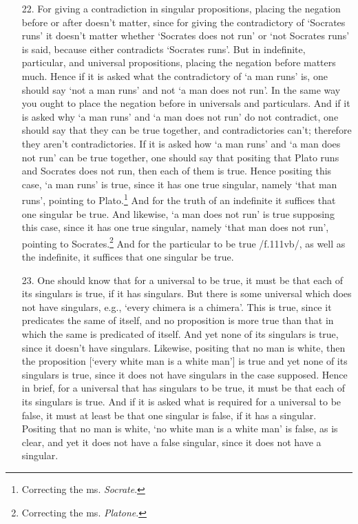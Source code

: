 \begin{enumerate}
\item[22.] For giving a contradiction in singular propositions, placing the negation before or after doesn't matter, since for giving the contradictory of `Socrates runs' it doesn't matter whether `Socrates does not run' or `not Socrates runs' is said, because either contradicts `Socrates runs'. But in indefinite, particular, and universal propositions, placing the negation before matters much. Hence if it is asked what the contradictory of `a man runs' is, one should say `not a man runs' and not `a man does not run'. In the same way you ought to place the negation before in universals and particulars. And if it is asked why `a man runs' and `a man does not run' do not contradict, one should say that they can be true together, and contradictories can't; therefore they aren't contradictories. If it is asked how `a man runs' and `a man does not run' can be true together, one should say that positing that Plato runs and Socrates does not run, then each of them is true. Hence positing this case, `a man runs' is true, since it has one true singular, namely `that man runs', pointing to Plato.\footnote{Correcting the ms. \textit{Socrate}.} And for the truth of an indefinite it suffices that one singular be true. And likewise, `a man does not run' is true supposing this case, since it has one true singular, namely `that man does not run', pointing to Socrates.\footnote{Correcting the ms. \textit{Platone}.} And for the particular to be true /f.111vb/, as well as the indefinite, it suffices that one singular be true.
\item[23.] One should know that for a universal to be true, it must be that each of its singulars is true, if it has singulars. But there is some universal which does not have singulars, e.g., `every chimera is a chimera'. This is true, since it predicates the same of itself, and no proposition is more true than that in which the same is predicated of itself. And yet none of its singulars is true, since it doesn't have singulars. Likewise, positing that no man is white, then the proposition [`every white man is a white man'] is true and yet none of its singulars is true, since it does not have singulars in the case supposed. Hence in brief, for a universal that has singulars to be true, it must be that each of its singulars is true. And if it is asked what is required for a universal to be false, it must at least be that one singular is false, if it has a singular. Positing that no man is white, `no white man is a white man' is false, as is clear, and yet it does not have a false singular, since it does not have a singular.

\end{enumerate}
